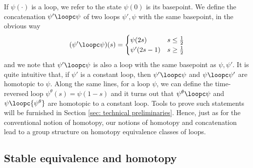 If $\psi(\cdot)$ is a loop, we refer to the state $\psi(0)$ is its basepoint. We define the concatenation $\psi' \loopc \psi$ of two loops $\psi',\psi$ with the same basepoint, in the obvious way
\begin{equation} \label{eq: concatenation}
	(\psi' \loopc \psi) (s) = \begin{cases} \psi(2s) &  s \leq \tfrac{1}{2}  \\
		\psi'(2s-1) &  s \geq \tfrac{1}{2}  \\
	\end{cases}
\end{equation}
and we note that $\psi' \loopc \psi$ is also a loop with the same basepoint as $\psi,\psi'$.
It is quite intuitive that, if $\psi'$ is a constant loop, then $\psi' \loopc \psi$ and $\psi \loopc \psi'$ are homotopic to $\psi$. Along the same lines, for a loop $\psi$, we can define the time-reversed loop ${\psi^{\theta}}(s)=\psi(1-s)$ and it turns out that ${\psi^{\theta}} \loopc\psi$ and $\psi\loopc{\psi^{\theta}}$ are  homotopic to a constant loop. Tools to prove such statements will be furnished in Section \ref{sec: technical preliminaries}. Hence, just as for the conventional notion of homotopy, our notions of homotopy and concatenation lead to a group structure  on homotopy equivalence classes of loops.  

\subsection{Stable equivalence and homotopy}  \label{sec: stable equivalence and homotopy}
